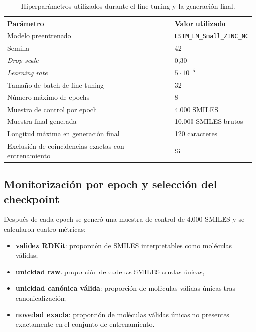 \documentclass[IB]{TFUOC}%
\begin{document}
\begin{table}[H]
    \centering
    \small
    \begin{tabular}{p{5.5cm} p{6cm}}
        \hline
        \textbf{Parámetro} & \textbf{Valor utilizado} \\
        \hline
        Modelo preentrenado & \texttt{LSTM\_LM\_Small\_ZINC\_NC} \\
        \hline
        Semilla & 42 \\
        \hline
        \textit{Drop scale} & 0,30 \\
        \hline
        \textit{Learning rate} & $5 \cdot 10^{-5}$ \\
        \hline
        Tamaño de batch de fine-tuning & 32 \\
        \hline
        Número máximo de epochs & 8 \\
        \hline
        Muestra de control por epoch & 4.000 SMILES \\
        \hline
        Muestra final generada & 10.000 SMILES brutos \\
        \hline
        Longitud máxima en generación final & 120 caracteres \\
        \hline
        Exclusión de coincidencias exactas con entrenamiento & Sí \\
        \hline
    \end{tabular}
    \caption{Hiperparámetros utilizados durante el fine-tuning y la generación final.}
    \label{tab:hiperparametros_mrl}
\end{table}

\subsection{Monitorización por epoch y selección del checkpoint}

Después de cada epoch se generó una muestra de control de 4.000 SMILES y se calcularon cuatro métricas:

\begin{itemize}
    \item \textbf{validez RDKit}: proporción de SMILES interpretables como moléculas válidas;
    \item \textbf{unicidad raw}: proporción de cadenas SMILES crudas únicas;
    \item \textbf{unicidad canónica válida}: proporción de moléculas válidas únicas tras canonicalización;
    \item \textbf{novedad exacta}: proporción de moléculas válidas únicas no presentes exactamente en el conjunto de entrenamiento.
\end{itemize}
\end{document}
